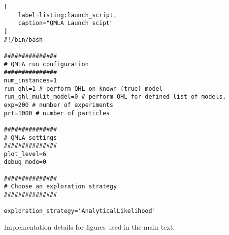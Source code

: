 \begin{lstlisting}[
    label=listing:launch_script,
    caption="QMLA Launch scipt"
]
#!/bin/bash

###############
# QMLA run configuration
###############
num_instances=1
run_qhl=1 # perform QHL on known (true) model
run_qhl_mulit_model=0 # perform QHL for defined list of models.
exp=200 # number of experiments
prt=1000 # number of particles

###############
# QMLA settings
###############
plot_level=6
debug_mode=0

###############
# Choose an exploration strategy 
###############

exploration_strategy='AnalyticalLikelihood'

\end{lstlisting}

\clearpage
\begin{sidewaystable}
    \begin{center}
        
    \end{center}
    \caption[Figure implementation details]{Implementation details for figures used in the main text.}
    \label{table:figure_reproduction}
\end{sidewaystable}
\clearpage